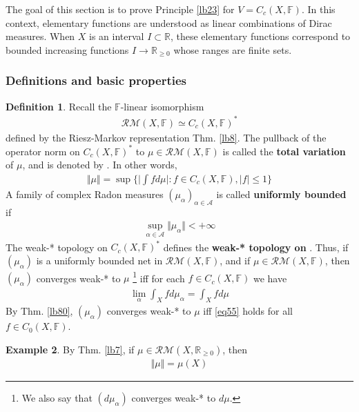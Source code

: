 \documentclass[12pt,b5paper,notitlepage]{article}
\theoremstyle{definition}
\newtheorem{df}{Definition}[subsection]
\newtheorem{eg}[df]{Example}
\theoremstyle{plain}
\newcommand{\scr}{\mathscr}
\newcommand{\Rbb}{\mathbb R}
\newcommand{\Fbb}{\mathbb F}
\newcommand{\RM}{\mathcal {RM}}
\numberwithin{equation}{section}
\begin{document}
The goal of this section is to prove Principle \ref{lb23} for $V=C_c(X,\Fbb)$. In this context, elementary functions are understood as linear combinations of Dirac measures. When $X$ is an interval $I\subset\Rbb$, these elementary functions correspond to bounded increasing functions $I\rightarrow\Rbb_{\geq0}$ whose ranges are finite sets.

\subsubsection{Definitions and basic properties}


\begin{df}
Recall the $\Fbb$-linear isomorphism
\begin{align*}
\RM(X,\Fbb)\simeq C_c(X,\Fbb)^*
\end{align*}
defined by the Riesz-Markov representation Thm. \ref{lb8}. The pullback of the operator norm on $C_c(X,\Fbb)^*$ to $\mu\in\RM(X,\Fbb)$ is called the \textbf{total variation} of $\mu$, and is denoted by \pmb{$\Vert\mu\Vert$}.   In other words,
\begin{align*}
\Vert\mu\Vert=\sup\Big\{\Big|\int fd\mu\Big|:f\in C_c(X,\Fbb),|f|\leq1 \Big\}
\end{align*}
A family of complex Radon measures $(\mu_\alpha)_{\alpha\in\scr A}$ is called \textbf{uniformly bounded}  if
\begin{align*}
\sup_{\alpha\in\scr A}\Vert\mu_\alpha\Vert<+\infty
\end{align*}
The weak-* topology on $C_c(X,\Fbb)^*$ defines the \textbf{weak-* topology on \pmb{$\RM(X,\Fbb)$}}. Thus, if $(\mu_\alpha)$ is a uniformly bounded net in $\RM(X,\Fbb)$, and if $\mu\in\RM(X,\Fbb)$, then $(\mu_\alpha)$ converges weak-* to $\mu$ \footnote{We also say that $(d\mu_\alpha)$ converges weak-* to $d\mu$.} iff for each $f\in C_c(X,\Fbb)$ we have
\begin{align}\label{eq55}
\lim_\alpha\int_Xfd\mu_\alpha=\int_X fd\mu
\end{align}
By Thm. \ref{lb80}, $(\mu_\alpha)$ converges weak-* to $\mu$ iff \eqref{eq55} holds for all $f\in C_0(X,\Fbb)$.
\end{df}






\begin{eg}\label{lb99}
By Thm. \ref{lb7}, if $\mu\in\RM(X,\Rbb_{\geq0})$, then
\begin{align*}
\Vert\mu\Vert=\mu(X)
\end{align*}
\end{eg}
\end{document}
